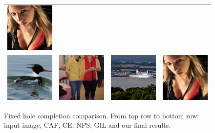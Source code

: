 \begin{figure}[H]
\begin{tabular}{cccc}
  \includegraphics[width=.24\textwidth]{figures/imagenet/imagenet_0197_g.png}\\
  \includegraphics[width=.24\textwidth]{figures/imagenet/imagenet_0011_synthesized_image.png}&
  \includegraphics[width=.24\textwidth]{figures/imagenet/imagenet_0034_synthesized_image.png}&
  \includegraphics[width=.24\textwidth]{figures/imagenet/imagenet_0165_synthesized_image.png}&
  \includegraphics[width=.24\textwidth]{figures/imagenet/imagenet_0197_synthesized_image.png}\\
\end{tabular}
\caption{Fixed hole completion comparison. From top row to bottom row: input image, CAF, CE, NPS, GIL and our final results.}
\label{fig:center}
\vspace{-10pt}
\end{figure}

